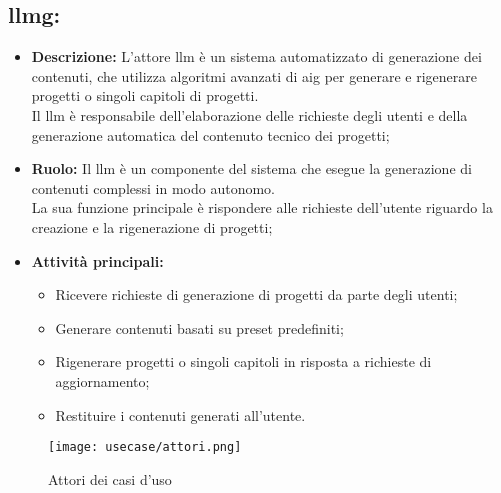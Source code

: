 \subsection*{\gls{llmg}:}

\begin{itemize}
    \item \textbf{Descrizione:}  L'attore \gls{llm} è un sistema automatizzato di generazione dei contenuti, che utilizza algoritmi avanzati di \gls{aig} per generare e rigenerare progetti o singoli capitoli di progetti. \\
    Il \gls{llm} è responsabile dell'elaborazione delle richieste degli utenti e della generazione automatica del contenuto tecnico dei progetti;
    \item \textbf{Ruolo:}  Il \gls{llm} è un componente del sistema che esegue la generazione di contenuti complessi in modo autonomo.\\
    La sua funzione principale è rispondere alle richieste dell'utente riguardo la creazione e la rigenerazione di progetti;
    \item \textbf{Attività principali:}
        \begin{itemize}
            \item Ricevere richieste di generazione di progetti da parte degli utenti;
            \item Generare contenuti basati su preset predefiniti;
            \item Rigenerare progetti o singoli capitoli in risposta a richieste di aggiornamento;
            \item Restituire i contenuti generati all'utente.
        \end{itemize}
\end{itemize}

\begin{figure}[H]
    \centering
    \texttt{[image: usecase/attori.png]}
    \caption{Attori dei casi d'uso}
    \label{fig:attori-casi-duso}
\end{figure}


